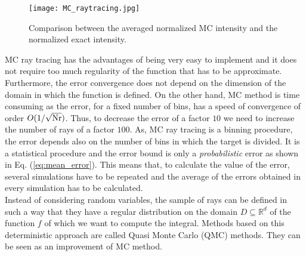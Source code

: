 \begin{figure}[t]
\begin{center}
    \texttt{[image: MC\_raytracing.jpg]}
    \caption{Comparison between the averaged normalized MC intensity and the normalized exact intensity.}
   \label{fig:mc_intensity}
\end{center}
\end{figure}
MC ray tracing has the advantages of being very easy to implement and it does not require too much regularity of the function that has to be approximate. Furthermore, the error convergence does not depend on the dimension of the domain in which the function is defined.
On the other hand, MC method is time consuming as the error, for a fixed number of bins, has a speed of convergence of order $O(1/\sqrt{\textrm{Nr}})$. 
Thus, to decrease the error of a factor $10$ we need to increase the number of rays of a factor $100$.
As, MC ray tracing is a binning procedure, the error depends also on the number of bins in which the target is divided. It is a statistical procedure and the error bound is only a \emph{probabilistic} error as shown in Eq. (\ref{eq:mean_error}). This means that, to calculate the value of the error, several simulations have to be repeated and the average of the errors obtained in every simulation has to be calculated. \\ \indent 
Instead of considering random variables, the sample of rays can be defined in such a way that they have a regular distribution on the domain $D\subseteq\mathbb{R}^d$ of the function $f$ of which we want to compute the integral. Methods based on this deterministic approach are called Quasi Monte Carlo (QMC) methods. They can be seen as an improvement of MC method.
